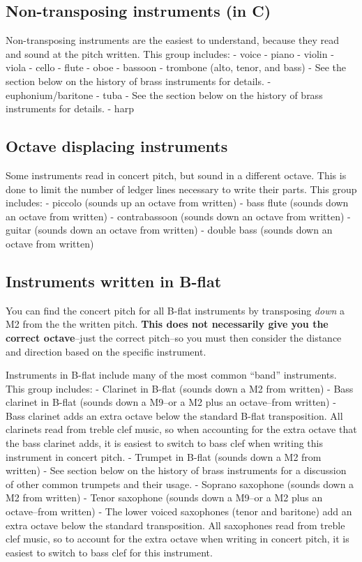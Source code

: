 \documentclass{book}
\begin{document}
\hypertarget{non-transposing-instruments-in-c}{%
\subsection{Non-transposing instruments (in
C)}\label{non-transposing-instruments-in-c}}

Non-transposing instruments are the easiest to understand, because they read
and sound at the pitch written. This group includes: - voice - piano - violin
- viola - cello - flute - oboe - bassoon - trombone (alto, tenor, and bass) -
See the section below on the history of brass instruments for details. -
euphonium/baritone - tuba - See the section below on the history of brass
instruments for details. - harp

\hypertarget{octave-displacing-instruments}{%
\subsection{Octave displacing
instruments}\label{octave-displacing-instruments}}

Some instruments read in concert pitch, but sound in a different octave. This
is done to limit the number of ledger lines necessary to write their parts.
This group includes: - piccolo (sounds up an octave from written) - bass flute
(sounds down an octave from written) - contrabassoon (sounds down an octave
from written) - guitar (sounds down an octave from written) - double bass
(sounds down an octave from written)

\hypertarget{instruments-written-in-b-flat}{%
\subsection{Instruments written in
B-flat}\label{instruments-written-in-b-flat}}

You can find the concert pitch for all B-flat instruments by transposing
\emph{down} a M2 from the the written pitch. \textbf{This does not necessarily
give you the correct octave}--just the correct pitch--so you must then
consider the distance and direction based on the specific instrument.

Instruments in B-flat include many of the most common ``band'' instruments.
This group includes: - Clarinet in B-flat (sounds down a M2 from written) -
Bass clarinet in B-flat (sounds down a M9--or a M2 plus an octave--from
written) - Bass clarinet adds an extra octave below the standard B-flat
transposition. All clarinets read from treble clef music, so when accounting
for the extra octave that the bass clarinet adds, it is easiest to switch to
bass clef when writing this instrument in concert pitch. - Trumpet in B-flat
(sounds down a M2 from written) - See section below on the history of brass
instruments for a discussion of other common trumpets and their usage. -
Soprano saxophone (sounds down a M2 from written) - Tenor saxophone (sounds
down a M9--or a M2 plus an octave--from written) - The lower voiced saxophones
(tenor and baritone) add an extra octave below the standard transposition. All
saxophones read from treble clef music, so to account for the extra octave
when writing in concert pitch, it is easiest to switch to bass clef for this
instrument.
\end{document}
